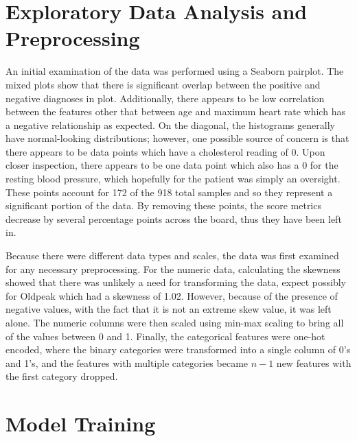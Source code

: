 \documentclass[12pt]{article}
\begin{document}
\section*{Exploratory Data Analysis and Preprocessing}


An initial examination of the data was performed using a Seaborn pairplot. The mixed plots 
show that there is significant overlap between the positive and negative diagnoses in plot. 
Additionally, there appears to be low correlation between the features other that between 
age and maximum heart rate which has a negative relationship as expected. On the diagonal, 
the histograms generally have normal-looking distributions; however, one possible source of 
concern is that there appears to be data points which have a cholesterol reading of 0. Upon 
closer inspection, there appears to be one data point which also has a 0 for the resting 
blood pressure, which hopefully for the patient was simply an oversight. These points 
account for 172 of the 918 total samples and so they represent a significant portion of the 
data. By removing these points, the score metrics decrease by several percentage points 
across the board, thus they have been left in. 

Because there were different data types and scales, the data was first examined for any 
necessary preprocessing. For the numeric data, calculating the skewness showed that there 
was unlikely a need for transforming the data, expect possibly for Oldpeak which had a 
skewness of 1.02. However, because of the presence of negative values, with the fact that it
is not an extreme skew value, it was left alone. The numeric columns were then scaled using 
min-max scaling to bring all of the values between 0 and 1. Finally, the categorical 
features were one-hot encoded, where the binary categories were transformed into a single 
column of 0's and 1's, and the features with multiple categories became $n-1$ new features 
with the first category dropped.

\section*{Model Training}

\end{document}
